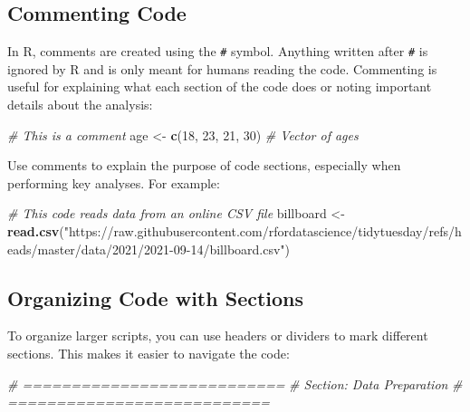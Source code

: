 \documentclass[
]{book}
\newenvironment{Shaded}{\begin{snugshade}}{\end{snugshade}}
\newcommand{\CommentTok}[1]{\textcolor[rgb]{0.56,0.35,0.01}{\textit{#1}}}
\newcommand{\DecValTok}[1]{\textcolor[rgb]{0.00,0.00,0.81}{#1}}
\newcommand{\FunctionTok}[1]{\textcolor[rgb]{0.13,0.29,0.53}{\textbf{#1}}}
\newcommand{\NormalTok}[1]{#1}
\newcommand{\OtherTok}[1]{\textcolor[rgb]{0.56,0.35,0.01}{#1}}
\newcommand{\StringTok}[1]{\textcolor[rgb]{0.31,0.60,0.02}{#1}}
\begin{document}
\subsection*{Commenting Code}\label{commenting-code}

In R, comments are created using the \texttt{\#} symbol. Anything written after \texttt{\#} is ignored by R and is only meant for humans reading the code. Commenting is useful for explaining what each section of the code does or noting important details about the analysis:

\begin{Shaded}
\begin{Highlighting}[]
\CommentTok{\# This is a comment}
\NormalTok{age }\OtherTok{\textless{}{-}} \FunctionTok{c}\NormalTok{(}\DecValTok{18}\NormalTok{, }\DecValTok{23}\NormalTok{, }\DecValTok{21}\NormalTok{, }\DecValTok{30}\NormalTok{)  }\CommentTok{\# Vector of ages}
\end{Highlighting}
\end{Shaded}

Use comments to explain the purpose of code sections, especially when performing key analyses. For example:

\begin{Shaded}
\begin{Highlighting}[]
\CommentTok{\# This code reads data from an online CSV file}
\NormalTok{billboard }\OtherTok{\textless{}{-}} \FunctionTok{read.csv}\NormalTok{(}\StringTok{"https://raw.githubusercontent.com/rfordatascience/tidytuesday/refs/heads/master/data/2021/2021{-}09{-}14/billboard.csv"}\NormalTok{)}
\end{Highlighting}
\end{Shaded}

\subsection*{Organizing Code with Sections}\label{organizing-code-with-sections}

To organize larger scripts, you can use headers or dividers to mark different sections. This makes it easier to navigate the code:

\begin{Shaded}
\begin{Highlighting}[]
\CommentTok{\# ===========================}
\CommentTok{\# Section: Data Preparation}
\CommentTok{\# ===========================}
\end{Highlighting}
\end{Shaded}
\end{document}
